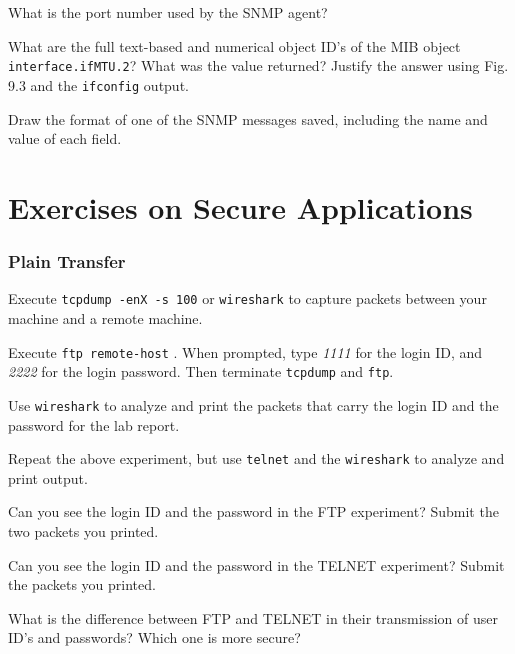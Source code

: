 \documentclass{../UTNetLab}
\begin{document}
    \begin{report}
    \item What is the port number used by the SNMP agent?
    
    \item What are the full text-based and numerical object ID’s of the MIB object \texttt{interface.ifMTU.2}? What was the value returned? Justify the answer using Fig. 9.3 and the \lstinline{ifconfig} output.
    
    \item Draw the format of one of the SNMP messages saved, including the name and value of each field.
    \end{report}

\part{Exercises on Secure Applications}
    
\section{Plain Transfer}
    Execute \lstinline{tcpdump -enX -s 100} or \lstinline{wireshark} to capture packets between your machine and a remote machine.

    Execute \lstinline[emph={remote-host}]{ftp remote-host} . When prompted, type \textit{1111} for the login ID, and \textit{2222} for the login password. Then terminate \lstinline{tcpdump} and \lstinline{ftp}.

    Use \lstinline{wireshark} to analyze and print the packets that carry the login ID and the password for the lab report.

    Repeat the above experiment, but use \lstinline{telnet} and the \lstinline{wireshark} to analyze and print output.

    \begin{report}
    \item Can you see the login ID and the password in the FTP experiment? Submit the two packets you printed.
    
    \item Can you see the login ID and the password in the TELNET experiment? Submit the packets you printed.
    
    \item What is the difference between FTP and TELNET in their transmission of user ID’s and passwords? Which one is more secure?
    \end{report}
\end{document}
